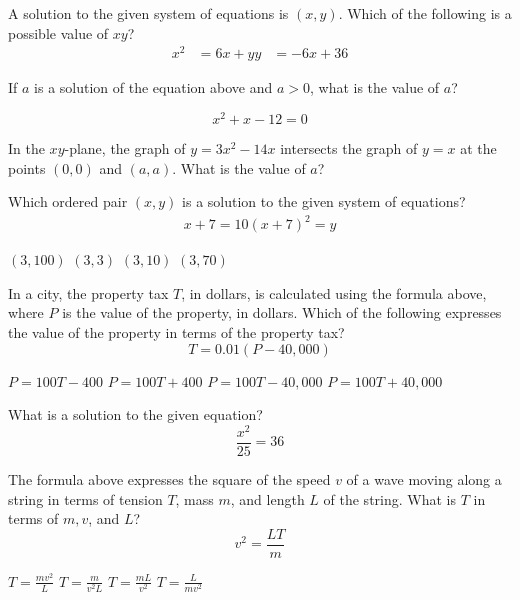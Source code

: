 \question[1]
A solution to the given system of equations is $(x, y)$. Which of the following is a possible value of $x y$?
\[
\begin{aligned}
x^{2} & =6 x+y 
y & =-6 x+36
\end{aligned}
\]
\begin{choices}
\end{choices}

\question[1]
If $a$ is a solution of the equation above and $a>0$, what is the value of $a$?

\[
x^{2}+x-12=0
\]

\begin{solutionorbox}[1in]
\end{solutionorbox}

\question[1]
In the $x y$-plane, the graph of $y=3 x^{2}-14 x$ intersects the graph of $y=x$ at the points $(0,0)$ and $(a, a)$. What is the value of $a$?

\begin{solutionorbox}[1in]
\end{solutionorbox}

\question[1]
Which ordered pair $(x, y)$ is a solution to the given system of equations?
\[
\begin{gathered}
x+7=10 
(x+7)^{2}=y
\end{gathered}
\]
\begin{choices}
  \choice $(3,100)$
  \choice $(3,3)$
  \CorrectChoice $(3,10)$
  \choice $(3,70)$
\end{choices}

\newpage

\question[1]
In a city, the property tax $T$, in dollars, is calculated using the formula above, where $P$ is the value of the property, in dollars. Which of the following expresses the value of the property in terms of the property tax?
\[
T=0.01(P-40,000)
\]
\begin{choices}
  \choice $P=100 T-400$
  \choice $P=100 T+400$
  \choice $P=100 T-40,000$
  \CorrectChoice $P=100 T+40,000$
\end{choices}

\question[1]
What is a solution to the given equation?
\[
\frac{x^{2}}{25}=36
\]
\begin{choices}
\end{choices}

\question[1]
The formula above expresses the square of the speed $v$ of a wave moving along a string in terms of tension $T$, mass $m$, and length $L$ of the string. What is $T$ in terms of $m, v$, and $L$?
\[
v^{2}=\frac{L T}{m}
\]
\begin{choices}
  \CorrectChoice $T=\frac{m v^{2}}{L}$
  \choice $T=\frac{m}{v^{2} L}$
  \choice $T=\frac{m L}{v^{2}}$
  \choice $T=\frac{L}{m v^{2}}$
\end{choices}

